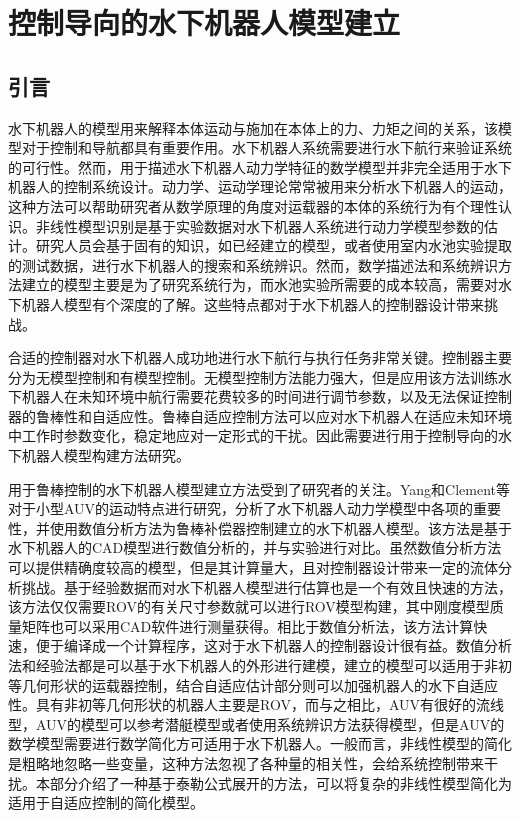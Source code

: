 


\chapter{控制导向的水下机器人模型建立}
\label{chap:modelingforcontrol}
\section{引言 }
水下机器人的模型用来解释本体运动与施加在本体上的力、力矩之间的关系，该模型对于控制和导航都具有重要作用。水下机器人系统需要进行水下航行来验证系统的可行性。然而，用于描述水下机器人动力学特征的数学模型并非完全适用于水下机器人的控制系统设计。动力学、运动学理论常常被用来分析水下机器人的运动，这种方法可以帮助研究者从数学原理的角度对运载器的本体的系统行为有个理性认识。非线性模型识别是基于实验数据对水下机器人系统进行动力学模型参数的估计。研究人员会基于固有的知识，如已经建立的模型，或者使用室内水池实验提取的测试数据，进行水下机器人的搜索和系统辨识。然而，数学描述法和系统辨识方法建立的模型主要是为了研究系统行为，而水池实验所需要的成本较高，需要对水下机器人模型有个深度的了解。这些特点都对于水下机器人的控制器设计带来挑战。

合适的控制器对水下机器人成功地进行水下航行与执行任务非常关键。控制器主要分为无模型控制和有模型控制。无模型控制方法能力强大，但是应用该方法训练水下机器人在未知环境中航行需要花费较多的时间进行调节参数，以及无法保证控制器的鲁棒性和自适应性。鲁棒自适应控制方法可以应对水下机器人在适应未知环境中工作时参数变化，稳定地应对一定形式的干扰。因此需要进行用于控制导向的水下机器人模型构建方法研究。

用于鲁棒控制的水下机器人模型建立方法受到了研究者的关注。Yang和Clement等对于小型AUV的运动特点进行研究，分析了水下机器人动力学模型中各项的重要性，并使用数值分析方法为鲁棒补偿器控制建立的水下机器人模型\cite{yang2015modeling}。该方法是基于水下机器人的CAD模型进行数值分析的，并与实验进行对比。虽然数值分析方法可以提供精确度较高的模型，但是其计算量大，且对控制器设计带来一定的流体分析挑战。基于经验数据而对水下机器人模型进行估算也是一个有效且快速的方法，该方法仅仅需要ROV的有关尺寸参数就可以进行ROV模型构建，其中刚度模型质量矩阵也可以采用CAD软件进行测量获得。相比于数值分析法，该方法计算快速，便于编译成一个计算程序，这对于水下机器人的控制器设计很有益。数值分析法和经验法都是可以基于水下机器人的外形进行建模，建立的模型可以适用于非初等几何形状的运载器控制，结合自适应估计部分则可以加强机器人的水下自适应性。具有非初等几何形状的机器人主要是ROV，而与之相比，AUV有很好的流线型，AUV的模型可以参考潜艇模型或者使用系统辨识方法获得模型，但是AUV的数学模型需要进行数学简化方可适用于水下机器人。一般而言，非线性模型的简化是粗略地忽略一些变量，这种方法忽视了各种量的相关性，会给系统控制带来干扰。本部分介绍了一种基于泰勒公式展开的方法，可以将复杂的非线性模型简化为适用于自适应控制的简化模型。


